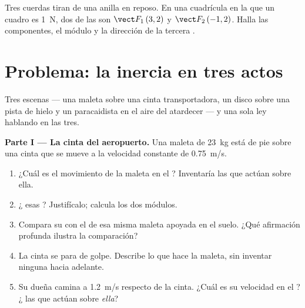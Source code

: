 \begin{exercise}[$\star\star\star$]\label{exo:g10:inertia:15}
Tres cuerdas tiran de una anilla en reposo. En una cuadrícula en la que
un cuadro es \qty{1}{N}, dos de las  son
$\vect F_1\,(3, 2)$ y $\vect F_2\,(-1, 2)$. Halla las componentes, el
módulo y la dirección de la tercera .
\end{exercise}

\section{Problema: la inercia en tres actos}

\begin{problem}
\label{pb:g10:inertia:1}
Tres escenas --- una maleta sobre una cinta transportadora, un disco
sobre una pista de hielo y un paracaidista en el aire del atardecer ---
y una sola ley hablando en las tres.

\medskip
\noindent\textbf{Parte I --- La cinta del aeropuerto.}
Una maleta de \qty{23}{kg} está de pie sobre una cinta que se mueve a la
velocidad constante de \qty{0.75}{m/s}.
\begin{enumerate}
  \item ¿Cuál es el movimiento de la maleta en el ?
        Inventaría las  que actúan sobre ella.
  \item ¿ esas ? Justifícalo; calcula los dos
        módulos.
  \item Compara su  con el de esa misma maleta
        apoyada en el suelo. ¿Qué afirmación profunda ilustra la
        comparación?
  \item La cinta se para de golpe. Describe lo que hace la maleta, sin
        inventar ninguna  hacia adelante.
  \item Su dueña camina a \qty{1.2}{m/s} respecto de la cinta. ¿Cuál es
        su velocidad en el ? ¿ las 
        que actúan sobre \emph{ella}?
\end{enumerate}


\end{problem}

